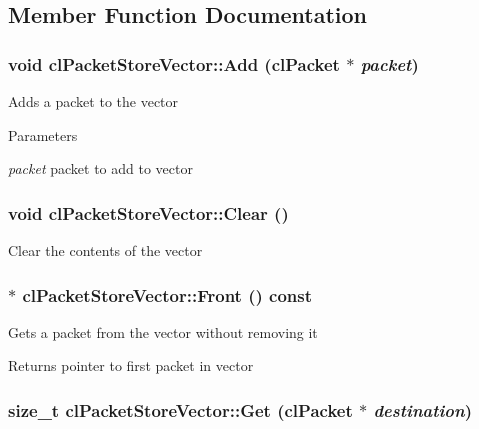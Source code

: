 \subsection{Member Function Documentation}
\hypertarget{classcl_packet_store_vector_ace15f00dffcf3a84f084b5e7c47aa228}{
\subsubsection[{Add}]{\setlength{\rightskip}{0pt plus 5cm}void clPacketStoreVector::Add ({\bf clPacket} $\ast$ {\em packet})}}
\label{classcl_packet_store_vector_ace15f00dffcf3a84f084b5e7c47aa228}
Adds a packet to the vector 
\begin{DoxyParams}{Parameters}
\item[{\em packet}]packet to add to vector \end{DoxyParams}
\hypertarget{classcl_packet_store_vector_affae13acdd3930ca0aa2609eae23dae6}{
\subsubsection[{Clear}]{\setlength{\rightskip}{0pt plus 5cm}void clPacketStoreVector::Clear ()}}
\label{classcl_packet_store_vector_affae13acdd3930ca0aa2609eae23dae6}
Clear the contents of the vector \hypertarget{classcl_packet_store_vector_a64a1bca7ea8a2c85feab5e743c3c37c2}{
\subsubsection[{Front}]{ $\ast$ clPacketStoreVector::Front () const}}
\label{classcl_packet_store_vector_a64a1bca7ea8a2c85feab5e743c3c37c2}
Gets a packet from the vector without removing it \begin{DoxyReturn}{Returns}
pointer to first packet in vector 
\end{DoxyReturn}
\hypertarget{classcl_packet_store_vector_a1166335dc4abb21918e4d3df80032ff0}{
\subsubsection[{Get}]{\setlength{\rightskip}{0pt plus 5cm}size\_\-t clPacketStoreVector::Get ({\bf clPacket} $\ast$ {\em destination})}}
